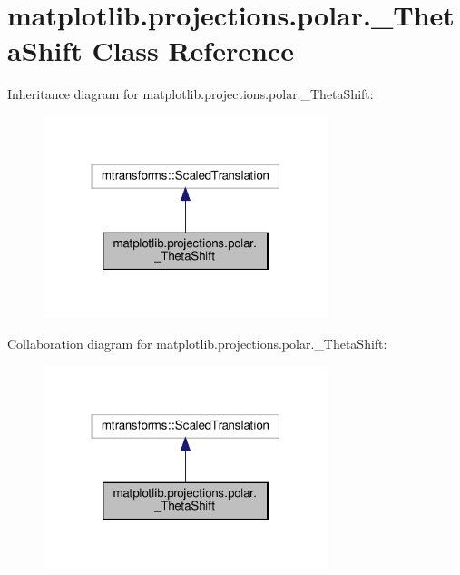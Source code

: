 \hypertarget{classmatplotlib_1_1projections_1_1polar_1_1__ThetaShift}{}\section{matplotlib.\+projections.\+polar.\+\_\+\+Theta\+Shift Class Reference}
\label{classmatplotlib_1_1projections_1_1polar_1_1__ThetaShift}


Inheritance diagram for matplotlib.\+projections.\+polar.\+\_\+\+Theta\+Shift\+:
\nopagebreak
\begin{figure}[H]
\begin{center}
\leavevmode
\includegraphics[width=235pt]{classmatplotlib_1_1projections_1_1polar_1_1__ThetaShift__inherit__graph}
\end{center}
\end{figure}


Collaboration diagram for matplotlib.\+projections.\+polar.\+\_\+\+Theta\+Shift\+:
\nopagebreak
\begin{figure}[H]
\begin{center}
\leavevmode
\includegraphics[width=235pt]{classmatplotlib_1_1projections_1_1polar_1_1__ThetaShift__coll__graph}
\end{center}
\end{figure}
